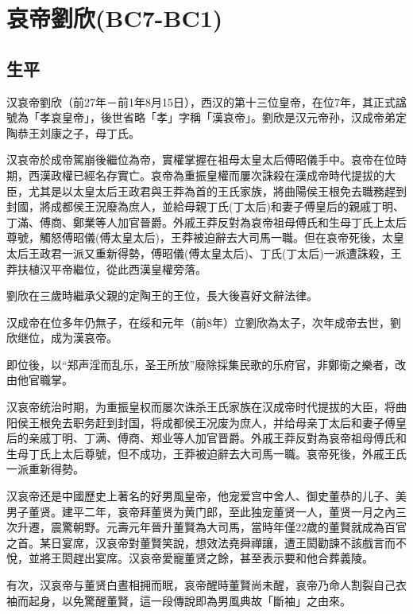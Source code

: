 
\section{哀帝劉欣\tiny(BC7-BC1)}

\subsection{生平}

汉哀帝劉欣（前27年－前1年8月15日），西汉的第十三位皇帝，在位7年，其正式諡號為「孝哀皇帝」，後世省略「孝」字稱「漢哀帝」。劉欣是汉元帝孙，汉成帝弟定陶恭王刘康之子，母丁氏。

汉哀帝於成帝駕崩後繼位為帝，實權掌握在祖母太皇太后傅昭儀手中。哀帝在位時期，西漢政權已經名存實亡。哀帝為重振皇權而屢次誅殺在漢成帝時代提拔的大臣，尤其是以太皇太后王政君與王莽為首的王氏家族，將曲陽侯王根免去職務趕到封國，將成都侯王況廢為庶人，並給母親丁氏(丁太后)和妻子傅皇后的親戚丁明、丁滿、傅商、鄭業等人加官晉爵。外戚王莽反對為哀帝祖母傅氏和生母丁氏上太后尊號，觸怒傅昭儀(傅太皇太后)，王莽被迫辭去大司馬一職。但在哀帝死後，太皇太后王政君一派又重新得勢，傅昭儀(傅太皇太后)、丁氏(丁太后)一派遭誅殺，王莽扶植汉平帝繼位，從此西漢皇權旁落。

劉欣在三歲時繼承父親的定陶王的王位，長大後喜好文辭法律。

汉成帝在位多年仍無子，在绥和元年（前8年）立劉欣為太子，次年成帝去世，劉欣继位，成为漢哀帝。

即位後，以“郑声淫而乱乐，圣王所放”廢除採集民歌的乐府官，非鄭衛之樂者，改由他官職掌。

汉哀帝统治时期，为重振皇权而屡次诛杀王氏家族在汉成帝时代提拔的大臣，将曲阳侯王根免去职务赶到封国，将成都侯王况废为庶人，并给母亲丁太后和妻子傅皇后的亲戚丁明、丁满、傅商、郑业等人加官晋爵。外戚王莽反對為哀帝祖母傅氏和生母丁氏上太后尊號，但不成功，王莽被迫辭去大司馬一職。哀帝死後，外戚王氏一派重新得勢。

汉哀帝还是中國歷史上著名的好男風皇帝，他宠爱宫中舍人、御史董恭的儿子、美男子董贤。建平二年，哀帝拜董贤为黄门郎，至此独宠董贤一人，董贤一月之內三次升遷，震驚朝野。元壽元年晉升董賢為大司馬，當時年僅22歲的董賢就成為百官之首。某日宴席，汉哀帝對董賢笑說，想效法堯舜禪讓，遭王閎勸諫不該戲言而不悅，並將王閎趕出宴席。汉哀帝愛寵董贤之餘，甚至表示要和他合葬義陵。

有次，汉哀帝与董贤白晝相拥而眠，哀帝醒時董賢尚未醒，哀帝乃命人割裂自己衣袖而起身，以免驚醒董賢，這一段傳說即為男風典故「斷袖」之由來。

